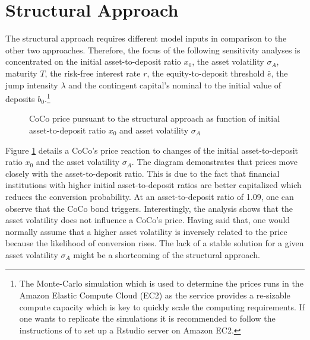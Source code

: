 \section{Structural Approach}\label{sensistructural}
The structural approach requires different model inputs in comparison to the other two approaches. Therefore, the focus of the following sensitivity analyses is concentrated on the initial asset-to-deposit ratio $x_0$, the asset volatility $\sigma_A$, maturity $T$, the risk-free interest rate $r$, the equity-to-deposit threshold $\bar{e}$, the jump intensity $\lambda$ and the contingent capital's nominal to the initial value of deposits $b_0$.\footnote{The Monte-Carlo simulation which is used to determine the prices runs in the Amazon Elastic Compute Cloud (EC2) as the service provides a re-sizable compute capacity which is key to quickly scale the computing requirements. If one wants to replicate the simulations it is recommended to follow the instructions of \citet{amazonrstudio} to set up a Rstudio server on Amazon EC2.} 

\begin{figure}[H]
\centering
    \caption[CoCo price pursuant to the structural approach as function of asset-to-deposit ratio and asset volatility]{CoCo price pursuant to the structural approach as function of initial asset-to-deposit ratio $x_0$ and asset volatility $\sigma_A$}
  \label{fig:sa1}
  \end{figure}
  
Figure \ref{fig:sa1} details a CoCo's price reaction to changes of the initial asset-to-deposit ratio $x_0$ and the asset volatility $\sigma_A$. The diagram demonstrates that prices move closely with the asset-to-deposit ratio. This is due to the fact that financial institutions with higher initial asset-to-deposit ratios are better capitalized which reduces the conversion probability. At an asset-to-deposit ratio of 1.09, one can observe that the CoCo bond triggers. Interestingly, the analysis shows that the asset volatility does not influence a CoCo's price. Having said that, one would normally assume that a higher asset volatility is inversely related to the price because the likelihood of conversion rises. The lack of a stable solution for a given asset volatility $\sigma_A$ might be a shortcoming of the structural approach.

